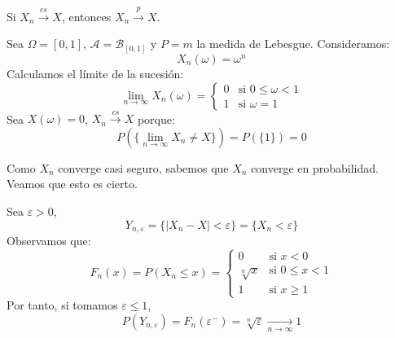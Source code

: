 \begin{theorem}
    Si $X_n \xrightarrow{cs} X$, entonces $X_n \xrightarrow{p} X$.
\end{theorem}

\begin{example}
    Sea $\Omega = [0, 1]$, $\mathcal{A} = \mathcal{B}_{[0, 1]}$ y $P = m$ la medida de Lebesgue.
    Consideramos:
    $$X_n(\omega) = \omega^n$$
    Calculamos el límite de la sucesión:
    $$\lim\limits_{n \to \infty} X_n(\omega) = \begin{cases}
            0 & \text{si } 0 \leq \omega < 1 \\
            1 & \text{si } \omega = 1
        \end{cases}$$
    Sea $X(\omega) = 0$, $X_n \xrightarrow{cs} X$ porque:
    $$P(\{\lim\limits_{n \to \infty} X_n \neq X\}) = P(\{1\}) = 0$$

    Como $X_n$ converge casi seguro, sabemos que $X_n$ converge en probabilidad.
    Veamos que esto es cierto.

    Sea $\varepsilon > 0$,
    $$Y_{n, \varepsilon} = \{|X_n - X| < \varepsilon\} = \{X_n < \varepsilon\}$$
    Observamos que:
    $$F_n(x) = P(X_n \leq x) = \begin{cases}
            0           & \text{si } x < 0        \\
            \sqrt[n]{x} & \text{si } 0 \leq x < 1 \\
            1           & \text{si } x \geq 1
        \end{cases}$$
    Por tanto, si tomamos $\varepsilon \leq 1$,
    $$P(Y_{n, \varepsilon}) = F_n(\varepsilon^-) = \sqrt[n]{\varepsilon} \xrightarrow[n \to \infty]{} 1$$
\end{example}

